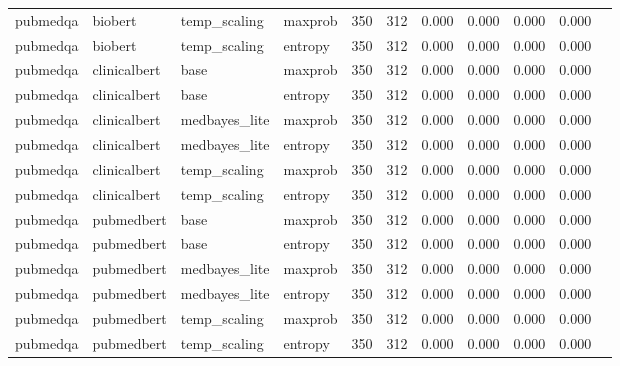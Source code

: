 \begin{table}[htbp]
\begin{tabular}{lllllllllll}
pubmedqa & biobert & temp\_scaling & maxprob & 350 & 312 & 0.000 & 0.000 & 0.000 & 0.000 &  \\
pubmedqa & biobert & temp\_scaling & entropy & 350 & 312 & 0.000 & 0.000 & 0.000 & 0.000 &  \\
pubmedqa & clinicalbert & base & maxprob & 350 & 312 & 0.000 & 0.000 & 0.000 & 0.000 &  \\
pubmedqa & clinicalbert & base & entropy & 350 & 312 & 0.000 & 0.000 & 0.000 & 0.000 &  \\
pubmedqa & clinicalbert & medbayes\_lite & maxprob & 350 & 312 & 0.000 & 0.000 & 0.000 & 0.000 &  \\
pubmedqa & clinicalbert & medbayes\_lite & entropy & 350 & 312 & 0.000 & 0.000 & 0.000 & 0.000 &  \\
pubmedqa & clinicalbert & temp\_scaling & maxprob & 350 & 312 & 0.000 & 0.000 & 0.000 & 0.000 &  \\
pubmedqa & clinicalbert & temp\_scaling & entropy & 350 & 312 & 0.000 & 0.000 & 0.000 & 0.000 &  \\
pubmedqa & pubmedbert & base & maxprob & 350 & 312 & 0.000 & 0.000 & 0.000 & 0.000 &  \\
pubmedqa & pubmedbert & base & entropy & 350 & 312 & 0.000 & 0.000 & 0.000 & 0.000 &  \\
pubmedqa & pubmedbert & medbayes\_lite & maxprob & 350 & 312 & 0.000 & 0.000 & 0.000 & 0.000 &  \\
pubmedqa & pubmedbert & medbayes\_lite & entropy & 350 & 312 & 0.000 & 0.000 & 0.000 & 0.000 &  \\
pubmedqa & pubmedbert & temp\_scaling & maxprob & 350 & 312 & 0.000 & 0.000 & 0.000 & 0.000 &  \\
pubmedqa & pubmedbert & temp\_scaling & entropy & 350 & 312 & 0.000 & 0.000 & 0.000 & 0.000 &  \\
\bottomrule
\end{tabular}
\end{table}
